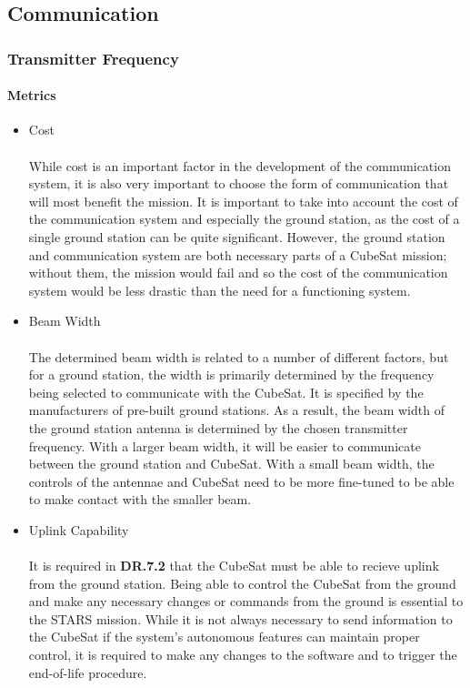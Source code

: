 
\subsection{Communication}
\subsubsection{Transmitter Frequency}
\paragraph{Metrics}
\begin{itemize}
    \item Cost \\
    \\
While cost is an important factor in the development of the communication system, it is also very important to choose the form of communication that will most benefit the mission. It is important to take into account the cost of the communication system and especially the ground station, as the cost of a single ground station can be quite significant. However, the ground station and communication system are both necessary parts of a CubeSat mission; without them, the mission would fail and so the cost of the communication system would be less drastic than the need for a functioning system. ~\\
    \item Beam Width \\
    \\
The determined beam width is related to a number of different factors, but for a ground station, the width is primarily determined by the frequency being selected to communicate with the CubeSat. It is specified by the manufacturers of pre-built ground stations. As a result, the beam width of the ground station antenna is determined by the chosen transmitter frequency. With a larger beam width, it will be easier to communicate between the ground station and CubeSat. With a small beam width, the controls of the antennae and CubeSat need to be more fine-tuned to be able to make contact with the smaller beam. ~\\
    \item Uplink Capability \\
    \\
It is required in \textbf{DR.7.2} that the CubeSat must be able to recieve uplink from the ground station. Being able to control the CubeSat from the ground and make any necessary changes or commands from the ground is essential to the STARS mission. While it is not always necessary to send information to the CubeSat if the system’s autonomous features can maintain proper control, it is required to make any changes to the software and to trigger the end-of-life procedure. ~\\

\end{itemize}
